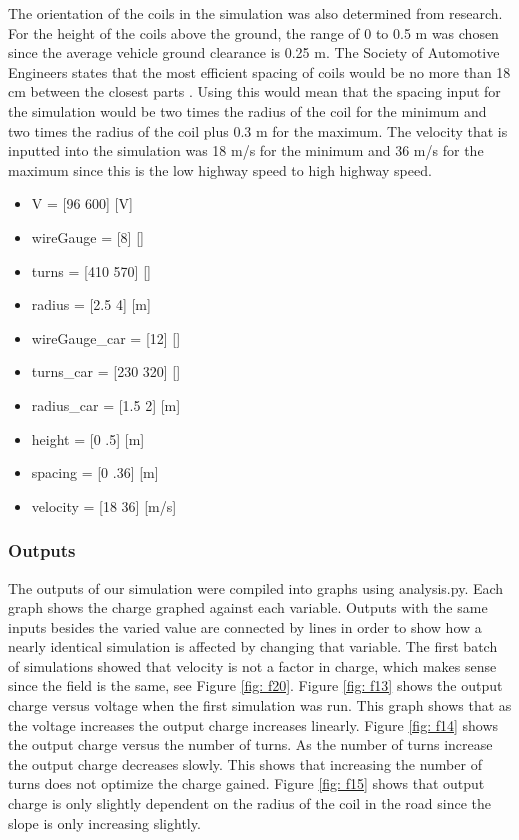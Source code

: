 The orientation of the coils in the simulation was also determined from research. For the height of the coils 
above the ground, the range of 0 to 0.5 m was chosen since the average vehicle ground clearance is 0.25 m. 
The Society of Automotive Engineers states that the most efficient spacing of coils would be no more than 18 cm 
between the closest parts \cite{noauthor_j2954_nodate}. Using this would mean that the spacing input for the simulation would 
be two times the radius of the coil for the minimum and two times the radius of the coil plus 0.3 m for the maximum. 
The velocity that is inputted into the simulation was 18 m/s for the minimum and 36 m/s for the maximum since this 
is the low highway speed to high highway speed. 

\begin{itemize}
    \item V = [96 600] [V]
    \item wireGauge = [8] []
    \item turns = [410 570] []
    \item radius = [2.5 4] [m]
    \item wireGauge\_car = [12] []
    \item turns\_car = [230 320] []
    \item radius\_car = [1.5 2] [m]
    \item height = [0 .5] [m]
    \item spacing = [0 .36] [m]
    \item velocity = [18 36] [m/s]
\end{itemize}

\subsubsection{Outputs}
The outputs of our simulation were compiled into graphs using analysis.py. Each graph shows the charge graphed 
against each variable. Outputs with the same inputs besides the varied value are connected by lines in order to 
show how a nearly identical simulation is affected by changing that variable. The first batch of simulations 
showed that velocity is not a factor in charge, which makes sense since the field is the same, see Figure \ref{fig: f20}. 
Figure \ref{fig: f13} shows the output charge versus voltage when the first simulation was run. This graph shows that as the 
voltage increases the output charge increases linearly. Figure \ref{fig: f14} shows the output charge versus the number of turns. 
As the number of turns increase the output charge decreases slowly. This shows that increasing the number of turns 
does not optimize the charge gained. Figure \ref{fig: f15} shows that output charge is only slightly dependent on the radius of 
the coil in the road since the slope is only increasing slightly. 
 	 
